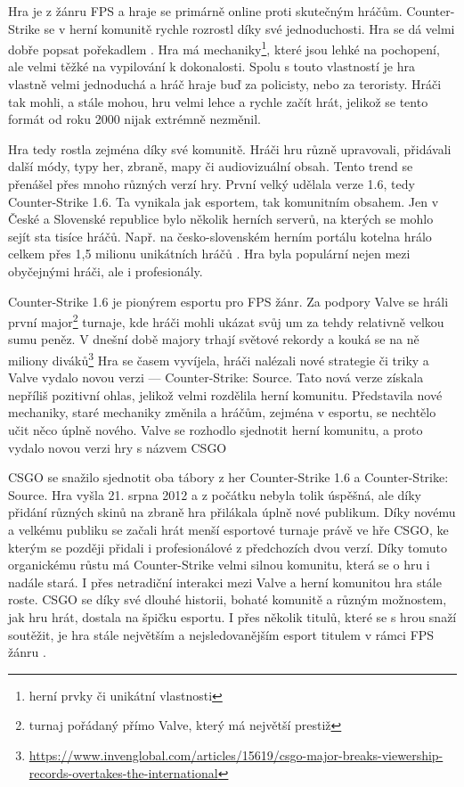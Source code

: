 Hra je z žánru \ac{FPS} a hraje se primárně online proti skutečným hráčům. Counter-Strike se v herní komunitě rychle rozrostl díky své jednoduchosti.
Hra se dá velmi dobře popsat pořekadlem . Hra má mechaniky\footnote{herní prvky či unikátní vlastnosti},
které jsou lehké na pochopení, ale velmi těžké na vypilování k dokonalosti. Spolu s touto vlastností je hra vlastně velmi jednoduchá a hráč hraje buď za policisty, nebo za
teroristy. Hráči tak mohli, a stále mohou, hru velmi lehce a rychle začít hrát, jelikož se tento formát od roku 2000 nijak extrémně nezměnil.

Hra tedy rostla zejména díky své komunitě. Hráči hru různě upravovali, přidávali další módy, typy her, zbraně, mapy či audiovizuální obsah. Tento trend se přenášel přes
mnoho různých verzí hry. První velký  udělala verze 1.6, tedy Counter-Strike 1.6. Ta vynikala jak esportem, tak komunitním obsahem. Jen v České a
Slovenské republice bylo několik herních serverů, na kterých se mohlo sejít sta tisíce hráčů. Např. na česko-slovenském herním portálu kotelna hrálo celkem přes
1,5 milionu unikátních hráčů \cite{cskocs_kotelna_2022}. Hra byla populární nejen mezi obyčejnými hráči, ale i profesionály.

Counter-Strike 1.6 je pionýrem esportu pro \ac{FPS} žánr. Za podpory Valve se hráli první major\footnote{turnaj pořádaný přímo Valve, který má největší prestiž} turnaje,
kde hráči mohli ukázat svůj um za tehdy relativně velkou sumu peněz. V dnešní době majory trhají světové rekordy a kouká se na ně miliony
diváků\footnote{\scriptsize \url{https://www.invenglobal.com/articles/15619/csgo-major-breaks-viewership-records-overtakes-the-international}}
Hra se časem vyvíjela, hráči nalézali nové strategie či triky a Valve vydalo novou verzi ---  Counter-Strike: Source. Tato nová verze získala nepříliš pozitivní ohlas,
jelikož velmi rozdělila herní komunitu. Představila nové mechaniky, staré mechaniky změnila a hráčům, zejména v esportu, se nechtělo učit něco úplně nového. Valve se rozhodlo
sjednotit herní komunitu, a proto vydalo novou verzi hry s názvem \ac{CSGO}

\ac{CSGO} se snažilo sjednotit oba tábory z her 
Counter-Strike 1.6 a Counter-Strike: Source. Hra vyšla 21. srpna 2012 a z počátku nebyla tolik úspěšná, ale díky přidání různých
skinů \cite{valve_counterstrike_2013} na zbraně hra přilákala úplně nové publikum. Díky novému a velkému publiku se začali hrát menší esportové turnaje právě ve hře \ac{CSGO}, ke kterým se
později přidali i profesionálové z předchozích dvou verzí. Díky tomuto organickému růstu má Counter-Strike velmi silnou komunitu, která se o hru i nadále stará. I přes
netradiční interakci mezi Valve a herní komunitou hra stále roste. \ac{CSGO} se díky své dlouhé historii, bohaté komunitě a různým možnostem, jak hru hrát, dostala na špičku
esportu. I přes několik titulů, které se s hrou snaží soutěžit, je hra stále největším a nejsledovanějším esport titulem v rámci \ac{FPS} žánru \cite{henningson_history_2020}.

